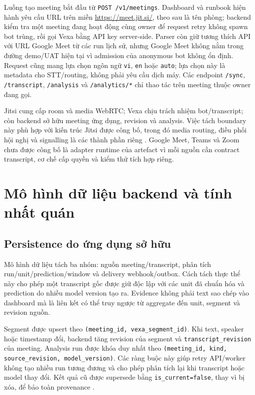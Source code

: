 Luồng tạo meeting bắt đầu từ \texttt{POST /v1/meetings}. Dashboard và runbook hiện hành yêu cầu URL trên miền \url{https://meet.jit.si/}, theo sau là tên phòng; backend kiểm tra một meeting đang hoạt động cùng owner để request retry không spawn bot trùng, rồi gọi Vexa bằng API key server-side. Parser còn giữ tương thích API với URL Google Meet từ các run lịch sử, nhưng Google Meet không nằm trong đường demo/UAT hiện tại vì admission của anonymous bot không ổn định. Request cũng mang lựa chọn ngôn ngữ \texttt{vi}, \texttt{en} hoặc \texttt{auto}; lựa chọn này là metadata cho STT/routing, không phải yêu cầu dịch máy. Các endpoint \texttt{/sync}, \texttt{/transcript}, \texttt{/analysis} và \texttt{/analytics/*} chỉ thao tác trên meeting thuộc owner đang gọi.

Jitsi cung cấp room và media WebRTC; Vexa chịu trách nhiệm bot/transcript; còn backend sở hữu meeting ứng dụng, revision và analysis. Việc tách boundary này phù hợp với kiến trúc Jitsi được công bố, trong đó media routing, điều phối hội nghị và signalling là các thành phần riêng \cite{jitsiArchitecture2026}. Google Meet, Teams và Zoom chưa được công bố là adapter runtime của artefact vì mỗi nguồn cần contract transcript, cơ chế cấp quyền và kiểm thử tích hợp riêng.

\section{Mô hình dữ liệu backend và tính nhất quán}
\subsection{Persistence do ứng dụng sở hữu}
Mô hình dữ liệu tách ba nhóm: nguồn meeting/transcript, phân tích run/unit/prediction/window và delivery webhook/outbox. Cách tách thực thể này cho phép một transcript gốc được giữ độc lập với các unit đã chuẩn hóa và prediction do nhiều model version tạo ra. Evidence không phải text sao chép vào dashboard mà là liên kết có thể truy ngược từ aggregate đến unit, segment và revision nguồn.

Segment được upsert theo \texttt{(meeting\_id, vexa\_segment\_id)}. Khi text, speaker hoặc timestamp đổi, backend tăng revision của segment và \texttt{transcript\_revision} của meeting. Analysis run được khóa duy nhất theo \texttt{(meeting\_id, kind, source\_revision, model\_version)}. Các ràng buộc này giúp retry API/worker không tạo nhiều run tương đương và cho phép phân tích lại khi transcript hoặc model thay đổi. Kết quả cũ được supersede bằng \texttt{is\_current=false}, thay vì bị xóa, để bảo toàn provenance \cite{buneman2001}.

